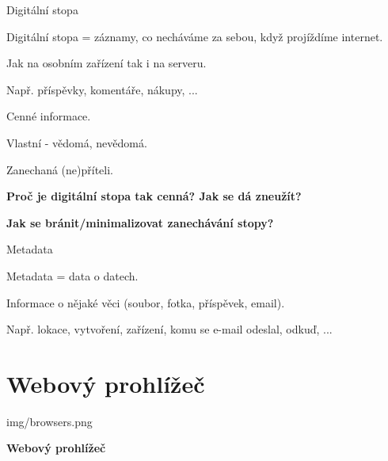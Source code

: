 \documentclass[aspectratio=169]{beamer}
\begin{document}
\begin{frame}{Digitální stopa}
    \begin{cardTiny}
        \begin{flushleft}
            Digitální stopa = záznamy, co necháváme za sebou, když projíždíme internet.

            Jak na osobním zařízení tak i na serveru.

            Např. příspěvky, komentáře, nákupy, ...

            Cenné informace.

            \vspace{2ex}

            Vlastní - vědomá, nevědomá.

            Zanechaná (ne)příteli.
        \end{flushleft}
    \end{cardTiny}
    \begin{cardTiny}
        \begin{center}
            \textbf{Proč je digitální stopa tak cenná? Jak se dá zneužít?}
        \end{center}
    \end{cardTiny}
    \begin{cardTiny}
        \begin{center}
            \textbf{Jak se bránit/minimalizovat zanechávání stopy?}
        \end{center}
    \end{cardTiny}
\end{frame}

\begin{frame}{Metadata}
    \begin{cardTiny}
        \begin{flushleft}
            Metadata = data o datech.

            Informace o nějaké věci (soubor, fotka, příspěvek, email).

            Např. lokace, vytvoření, zařízení, komu se e-mail odeslal, odkuď, ...
        \end{flushleft}
    \end{cardTiny}
\end{frame}


\section{Webový prohlížeč}

\begin{frameImg}[width]{img/browsers.png}
    \vspace*{60mm}
    \begin{cardTiny}
        \vspace*{\fill}
        \begin{center}
            \textbf{Webový prohlížeč}
        \end{center}
    \end{cardTiny}
\end{frameImg}
\end{document}
